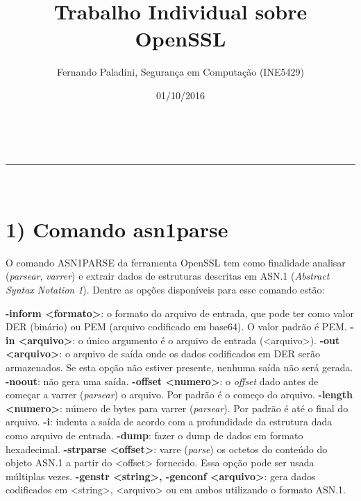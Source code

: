 \documentclass[a4paper,11pt]{article}
\makeatletter
\newcommand{\linia}{\rule{\linewidth}{0.5pt}}
\theoremstyle{mytheor}
\renewcommand{\maketitle}{
\begin{center}
\vspace{2ex}
{\huge \textsc{\@title}}
\vspace{1ex}
\\
\linia\\
\@author \hfill \@date
\vspace{4ex}
\end{center}
}
\makeatother
\begin{document}
\title{Trabalho Individual sobre OpenSSL}

\author{Fernando Paladini, Segurança em Computação (INE5429)}

\date{01/10/2016}

\maketitle

\section*{1) Comando asn1parse}

O comando ASN1PARSE da ferramenta OpenSSL tem como finalidade analisar (\textit{parsear}, \textit{varrer}) e extrair dados de estruturas descritas em ASN.1 (\textit{Abstract Syntax Notation 1}). Dentre as opções disponíveis para esse comando estão:\newline

\noindent \textbf{-inform <formato>}: o formato do arquivo de entrada, que pode ter como valor DER (binário) ou PEM (arquivo codificado em base64). O valor padrão é PEM.
\newline\newline
\noindent \textbf{-in <arquivo>}: o único argumento é o arquivo de entrada (<arquivo>).
\newline\newline
\noindent \textbf{-out <arquivo>}: o arquivo de saída onde os dados codificados em DER serão armazenados. Se esta opção não estiver presente, nenhuma saída não será gerada.
\newline\newline
\textbf{-noout}: não gera uma saída.
\newline\newline
\textbf{-offset <numero>}: o \textit{offset} dado antes de começar a varrer (\textit{parsear}) o arquivo. Por padrão é o começo do arquivo.
\newline\newline
\textbf{-length <numero>}: número de bytes para varrer (\textit{parsear}). Por padrão é até o final do arquivo.
\newline\newline
\textbf{-i}: indenta a saída de acordo com a profundidade da estrutura dada como arquivo de entrada.
\newline\newline
\textbf{-dump}: fazer o dump de dados em formato hexadecimal.
\newline\newline
\textbf{-strparse <offset>}: varre (\textit{parse}) os octetos do conteúdo do objeto ASN.1 a partir do <offset> fornecido. Essa opção pode ser usada múltiplas vezes.
\newline\newline
\textbf{-genstr <string>, -genconf <arquivo>}: gera dados codificados em <string>, <arquivo> ou em ambos utilizando o formato ASN.1.
\end{document}
